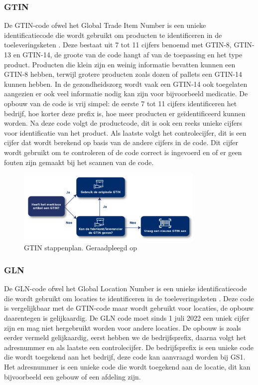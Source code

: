 \subsubsection{GTIN}
De GTIN-code ofwel het Global Trade Item Number is een unieke identificatiecode die wordt gebruikt om producten te identificeren in de toeleveringsketen \autocite{GTIN2025}.
Deze bestaat uit 7 tot 11 cijfers benoemd met GTIN-8, GTIN-13 en GTIN-14, de groote van de code hangt af van de toepassing en het type product.
Producten die klein zijn en weinig informatie bevatten kunnen een GTIN-8 hebben, terwijl grotere producten zoals dozen of pallets een GTIN-14 kunnen hebben.
In de gezondheidszorg wordt vaak een GTIN-14 ook toegelaten aangezien er ook veel informatie nodig kan zijn voor bijvoorbeeld medicatie.
De opbouw van de code is vrij simpel: de eerste 7 tot 11 cijfers identificeren het bedrijf, hoe korter deze prefix is, hoe meer producten er geïdentificeerd kunnen worden.
Na deze code volgt de productcode, dit is ook een reeks unieke cijfers voor identificatie van het product.
Als laatste volgt het controlecijfer, dit is een cijfer dat wordt berekend op basis van de andere cijfers in de code.
Dit cijfer wordt gebruikt om te controleren of de code correct is ingevoerd en of er geen fouten zijn gemaakt bij het scannen van de code.

\begin{figure}[h]
     \centering
     \includegraphics[width=0.8\textwidth]{./img/GTIN.png}
     \caption[GTIN stappenplan]{\label{fig:gtin} GTIN stappenplan. Geraadpleegd op~\cite{GTIN2025} }
\end{figure}

\subsubsection{GLN}
De GLN-code ofwel het Global Location Number is een unieke identificatiecode die wordt gebruikt om locaties te identificeren in de toeleveringsketen \autocite{GLN}.
Deze code is vergelijkbaar met de GTIN-code maar wordt gebruikt voor locaties, de opbouw daarentegen is gelijkaardig.
De GLN code moet sinds 1 juli 2022 een uniek cijfer zijn en mag niet hergebruikt worden voor andere locaties.
De opbouw is zoals eerder vermeld gelijkaardig, eerst hebben we de bedrijfsprefix, daarna volgt het adresnummer en als laatste een controlecijfer.
De bedrijfsprefix is een unieke code die wordt toegekend aan het bedrijf, deze code kan aanvraagd worden bij GS1. Het adresnummer is een unieke code die wordt toegekend aan de locatie, dit kan bijvoorbeeld een gebouw of een afdeling zijn.


